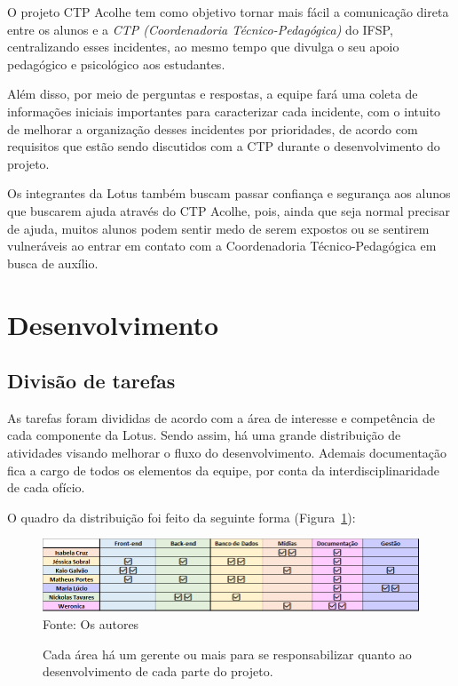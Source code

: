 \documentclass[12pt,a4paper]{article}
\begin{document}
O projeto \gls{CTP Acolhe} tem como objetivo tornar mais fácil a comunicação direta entre os alunos e a \textit{CTP (Coordenadoria Técnico-Pedagógica)} do \ac{IFSP}, centralizando esses incidentes, ao mesmo tempo que divulga o seu apoio pedagógico e psicológico aos estudantes. 

Além disso, por meio de perguntas e respostas, a equipe fará uma coleta de informações iniciais importantes para caracterizar cada incidente, com o intuito de melhorar a organização desses incidentes por prioridades, de acordo com requisitos que estão sendo discutidos com a \ac{CTP} durante o desenvolvimento do projeto. 

Os integrantes da \gls{Lotus} também buscam passar confiança e segurança aos alunos que buscarem ajuda através do \gls{CTP Acolhe}, pois, ainda que seja normal precisar de ajuda, muitos alunos podem sentir medo de serem expostos ou se sentirem vulneráveis ao entrar em contato com a Coordenadoria Técnico-Pedagógica em busca de auxílio. 

\newpage

\section{Desenvolvimento}

\subsection{Divisão de tarefas}
As tarefas foram divididas de acordo com a área de interesse e competência de cada componente da \gls{Lotus}. Sendo assim, há uma grande distribuição de atividades visando melhorar o fluxo do desenvolvimento. Ademais  documentação fica a cargo de todos os elementos da equipe, por conta da interdisciplinaridade de cada ofício.

 O quadro da distribuição foi feito da seguinte forma (Figura~\ref{taf}):
\begin{figure}[H]
    \centering
    \caption{Cada área há um gerente ou mais para se responsabilizar quanto ao desenvolvimento de cada     parte do projeto.} 
     \includegraphics[width=15cm]{taf.png}
    Fonte: Os autores
    \label{taf}
\end{figure}
\end{document}
